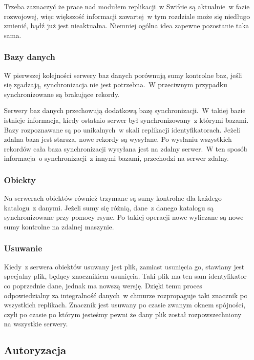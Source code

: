 Trzeba zaznaczyć że prace nad modułem replikacji~w Swifcie są aktualnie~w fazie rozwojowej, więc większość informacji zawartej~w tym rozdziale może się niedługo zmienić, bądź już jest nieaktualna. Niemniej ogólna idea zapewne pozostanie taka sama.

\subsubsection{Bazy danych}\label{sub:bazy danych}

W pierwszej kolejności serwery baz danych porównują sumy kontrolne baz, jeśli się zgadzają, synchronizacja nie jest potrzebna.~W przeciwnym przypadku synchronizowane są brakujące rekordy.

Serwery baz danych przechowują dodatkową bazę synchronizacji.~W takiej bazie istnieje informacja, kiedy ostatnio serwer był synchronizowany~z którymi bazami. Bazy rozpoznawane są po unikalnych~w skali replikacji identyfikatorach. Jeżeli zdalna baza jest starsza, nowe rekordy są wysyłane. Po wysłaniu wszystkich rekordów cała baza synchronizacji wysyłana jest na zdalny serwer.~W ten sposób informacja~o synchronizacji~z innymi bazami, przechodzi na serwer zdalny.

\subsubsection{Obiekty}\label{sub:obiekty}

Na serwerach obiektów również trzymane są sumy kontrolne dla każdego katalogu~z danymi. Jeżeli sumy się różnią, dane~z danego katalogu są synchronizowane przy pomocy rsync. Po takiej operacji nowe wyliczane są nowe sumy kontrolne na zdalnej maszynie.

\subsubsection{Usuwanie}\label{sub:usuwanie}

Kiedy~z serwera obiektów usuwany jest plik, zamiast usunięcia go, stawiany jest specjalny plik, będący znacznikiem usunięcia. Taki plik ma ten sam identyfikator co poprzednie dane, jednak ma nowszą wersję. Dzięki temu proces odpowiedzialny za integralność danych~w chmurze rozpropaguje taki znacznik po wszystkich replikach. Znacznik jest usuwany po czasie zwanym oknem spójności, czyli po czasie po którym jesteśmy pewni że dany plik został rozpowszechniony na wszystkie serwery.

\subsection{Autoryzacja}\label{sec:autoryzacja}

